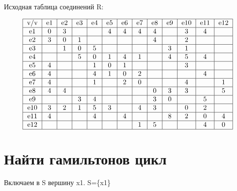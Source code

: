 \documentclass{article}
\begin{document}
\itmo[
  variant=161,
  labn=4,
  worktype=Домашняя работа,
  discipline=Дискретная математика,
  group=P3115,
  student=Владимир Мацюк,
  teacher=Поляков Владимир Иванович,
  logo=../../lib/img/itmo.png
]





Исходная таблица соединений R:



$$\begin{tabular}{|c|c|c|c|c|c|c|c|c|c|c|c|c|c|c|c|c|c|c|c|c|c|c|c|} \hline

    v/v & e1 & e2 & e3 & e4 & e5 & e6 & e7 & e8 & e9 & e10 & e11 & e12 \nl

    e1  & 0  & 3  &    &    & 4  & 4  & 4  & 4  &    & 3   & 4   & \nl

    e2  & 3  & 0  & 1  &    &    &    &    & 4  &    & 2   &     & \nl

    e3  &    & 1  & 0  & 5  &    &    &    &    & 3  & 1   &     & \nl

    e4  &    &    & 5  & 0  & 1  & 4  & 1  &    & 4  & 5   & 4   & \nl

    e5  & 4  &    &    & 1  & 0  & 1  &    &    &    & 3   &     & \nl

    e6  & 4  &    &    & 4  & 1  & 0  & 2  &    &    &     & 4   & \nl

    e7  & 4  &    &    & 1  &    & 2  & 0  &    &    & 4   &     & 1 \nl

    e8  & 4  & 4  &    &    &    &    &    & 0  & 3  & 3   &     & 5 \nl

    e9  &    &    & 3  & 4  &    &    &    & 3  & 0  &     & 5   & \nl

    e10 & 3  & 2  & 1  & 5  & 3  &    & 4  & 3  &    & 0   & 2   & \nl

    e11 & 4  &    &    & 4  &    & 4  &    &    & 8  & 2   & 0   & 4 \nl

    e12 &    &    &    &    &    &    & 1  & 5  &    &     & 4   & 0\nl
  \end{tabular}$$









\section{Найти гамильтонов цикл}



Включаем в S вершину x1. S=\{x1\}
\end{document}

